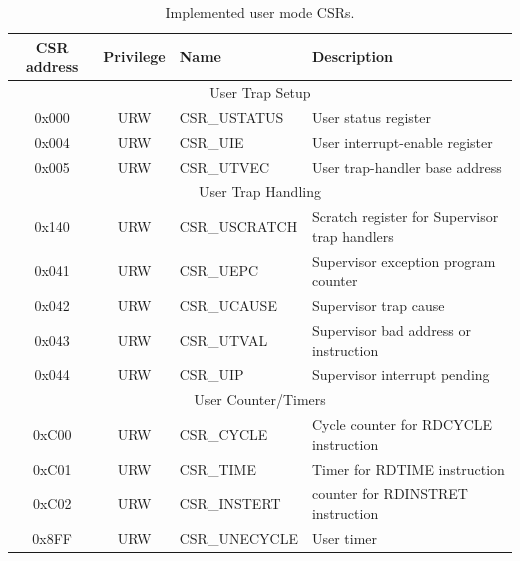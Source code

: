 \documentclass[../main.tex]{subfiles}
\begin{document}
\begin{table}[p]
\centering
\begin{tabular}{|c|c|p{3.5cm}| p{6.2cm}|} 
\hline
CSR address & Privilege & Name & Description \\
\hline
\multicolumn{4}{|c|}{User Trap Setup}\\
\hline
0x000 & URW & CSR\_USTATUS & User status register\\
0x004 & URW & CSR\_UIE & User interrupt-enable register\\
0x005 & URW & CSR\_UTVEC & User trap-handler base address\\
\hline
\multicolumn{4}{|c|}{User Trap Handling}\\
\hline
0x140 & URW & CSR\_USCRATCH & Scratch register for Supervisor trap handlers\\
0x041 & URW & CSR\_UEPC & Supervisor exception program counter\\
0x042 & URW & CSR\_UCAUSE & Supervisor trap cause\\
0x043 & URW & CSR\_UTVAL & Supervisor bad address or instruction\\
0x044 & URW & CSR\_UIP & Supervisor interrupt pending\\
\hline
\multicolumn{4}{|c|}{User Counter/Timers}\\
\hline
0xC00 & URW & CSR\_CYCLE & Cycle counter for RDCYCLE instruction\\
0xC01 & URW & CSR\_TIME & Timer for RDTIME instruction\\
0xC02 & URW & CSR\_INSTERT & counter for RDINSTRET instruction\\
0x8FF & URW & CSR\_UNECYCLE & User timer\\
\hline
\end{tabular}
\caption{Implemented user mode CSRs.}
\label{tab:user_CSRs}
\end{table}
\end{document}
